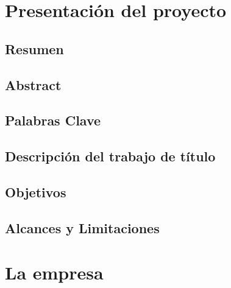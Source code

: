 \documentclass[letterpaper, 12pt]{report}
\begin{document}
\fancyhf{}

\renewcommand{\thepage}{\roman{page}}

\tableofcontents

\begin{singlespace}
  \listoffigures
\end{singlespace}


\setcounter{section}{1}

\chapter{Presentación del proyecto}

\section{Resumen}


\section{Abstract}
%

\clearpage
{}
\renewcommand{\thepage}{\arabic{page}}

\section{Palabras Clave}


\section{Descripción del trabajo de título}


\section{Objetivos}


\section{Alcances y Limitaciones}


\chapter{La empresa}
\end{document}
